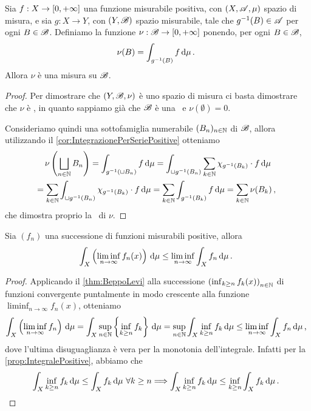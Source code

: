 \begin{lemma}\label{lemma:MisuraIntegrale}
	Sia $f:X\to[0,+\infty]$ una funzione misurabile positiva, con $(X,\mathscr A,\mu)$ spazio di misura, e sia $g:X\to Y$, con $(Y,\mathscr B)$ spazio misurabile, tale che $g^{-1}(B)\in\mathscr A$ per ogni $B\in\mathscr B$. Definiamo la funzione $\nu:\mathscr B\to[0,+\infty]$ ponendo, per ogni $B\in\mathscr B$,
	\begin{equation*}
		\nu(B)=\int_{g^{-1}(B)}f\,\mathrm d\mu\, \text{. }
	\end{equation*}
	Allora $\nu$ è una misura su $\mathscr B$.
\end{lemma}
\begin{proof}
	Per dimostrare che $(Y,\mathscr B,\nu)$ è uno spazio di misura ci basta dimostrare che $\nu$ è \sigadd, in quanto sappiamo già che $\mathscr B$ è una \sigalg\ e $\nu(\emptyset)=0$.
	
	Consideriamo quindi una sottofamiglia numerabile $(B_n)_{n\in\mathbb N}$ di $\mathscr B$, allora utilizzando il \cref{cor:IntegrazionePerSeriePositive} otteniamo
	\begin{multline*}
		\nu\left(\bigsqcup_{n\in\mathbb N}B_n\right)=\int_{g^{-1}(\sqcup B_n)}f\,\mathrm d\mu=\int_{\sqcup g^{-1}(B_n)}\sum_{k\in\mathbb N}\chi_{g^{-1}(B_k)}\cdot f\,\mathrm d\mu\\
		=\sum_{k\in\mathbb N}\int_{\sqcup g^{-1}(B_n)}\chi_{g^{-1}(B_k)}\cdot f\,\mathrm d\mu=
		\sum_{k\in\mathbb N}\int_{g^{-1}(B_k)}f\,\mathrm d\mu=\sum_{k\in\mathbb N}\nu(B_k)\, \text{, }
	\end{multline*}
	che dimostra proprio la \sigadd\ di $\nu$.
\end{proof}

\begin{lemma} \label{lemma:Fatou}
	Sia $(f_n)$ una successione di funzioni misurabili positive, allora 
	\begin{equation*}
		\int_X\left(\liminf_{n\to\infty}f_n(x)\right)\,\mathrm d\mu\le \liminf_{n\to\infty}\int_Xf_n\,\mathrm d\mu\, \text{. }
	\end{equation*}
\end{lemma}

\begin{proof}
	Applicando il \cref{thm:BeppoLevi} alla successione $\left(\inf_{k\ge n}f_k(x)\right)_{n\in\mathbb N}$ di funzioni convergente puntalmente in modo crescente alla funzione $\liminf_{n\to\infty}f_n(x)$, otteniamo
	\begin{equation*}
		\int_X\left(\liminf_{n\to\infty}f_n\right)\,\mathrm d\mu=\int_X \sup_{n\in\mathbb N}\left\{\inf_{k\ge n}f_k\right\}\,\mathrm d\mu=\sup_{n\in\mathbb N}\int_X \inf_{k\ge n}f_k\,\mathrm d\mu\le \liminf_{n\to\infty}\int_Xf_n\,\mathrm d\mu\, \text{, }
	\end{equation*}
	dove l'ultima disuguaglianza è vera per la monotonia dell'integrale. Infatti per la \cref{prop:IntegralePositive}, abbiamo che
	\begin{equation*}
		\int_X \inf_{k\ge n}f_k\,\mathrm d\mu\le \int_Xf_k\,\mathrm d\mu \ \forall k\ge n \Longrightarrow \int_X \inf_{k\ge n}f_k\,\mathrm d\mu\le \inf_{k\ge n}\int_Xf_k\,\mathrm d\mu\, \text{. }
	\end{equation*}
\end{proof}

